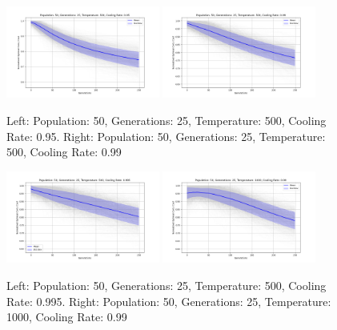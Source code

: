 \documentclass{article}
\begin{document}
    \begin{figure}[H]
        \centering
        \includegraphics[width=0.45\textwidth]{genetic_simulated_annealing_hybrid/appendix/Population_50_Generations_25_Temperature_500_CoolingRate_0.95.png}
        \includegraphics[width=0.45\textwidth]{genetic_simulated_annealing_hybrid/appendix/Population_50_Generations_25_Temperature_500_CoolingRate_0.99.png}
        \caption{Left: Population: 50, Generations: 25, Temperature: 500, Cooling Rate: 0.95. Right: Population: 50, Generations: 25, Temperature: 500, Cooling Rate: 0.99}
        \label{fig:app_ga_50_25_500_95_99}
    \end{figure}

    \begin{figure}[H]
        \centering
        \includegraphics[width=0.45\textwidth]{genetic_simulated_annealing_hybrid/appendix/Population_50_Generations_25_Temperature_500_CoolingRate_0.995.png}
        \includegraphics[width=0.45\textwidth]{genetic_simulated_annealing_hybrid/appendix/Population_50_Generations_25_Temperature_1000_CoolingRate_0.99.png}
        \caption{Left: Population: 50, Generations: 25, Temperature: 500, Cooling Rate: 0.995. Right: Population: 50, Generations: 25, Temperature: 1000, Cooling Rate: 0.99}
        \label{fig:app_ga_50_25_500_995_1000_99}
    \end{figure}
\end{document}
